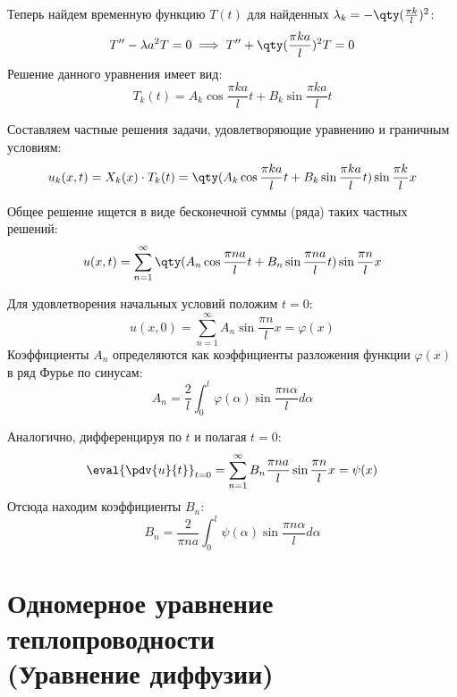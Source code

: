 Теперь найдем временную функцию $T(t)$ для найденных $\lambda_k = -\qty(\frac{\pi k}{l})^2$:
\begin{equation}
	T'' - \lambda a^2 T = 0 \implies T'' + \qty(\frac{\pi k a}{l})^2 T = 0
\end{equation}
Решение данного уравнения имеет вид:
\begin{equation}
	T_k(t) = A_k \cos \frac{\pi k a}{l} t + B_k \sin \frac{\pi k a}{l} t
\end{equation}

Составляем частные решения задачи, удовлетворяющие уравнению и граничным условиям:
\begin{equation}
	u_k(x,t) = X_k(x) \cdot T_k(t) = \qty( A_k \cos \frac{\pi k a}{l} t + B_k \sin \frac{\pi k a}{l} t ) \sin \frac{\pi k}{l} x
\end{equation}

Общее решение ищется в виде бесконечной суммы (ряда) таких частных решений:
\begin{equation}
	u(x,t) = \sum_{n=1}^{\infty} \qty( A_n \cos \frac{\pi n a}{l} t + B_n \sin \frac{\pi n a}{l} t ) \sin \frac{\pi n}{l} x
\end{equation}

Для удовлетворения начальных условий положим $t=0$:
\begin{equation}
	u(x,0) = \sum_{n=1}^{\infty} A_n \sin \frac{\pi n}{l} x = \varphi(x)
\end{equation}
Коэффициенты $A_n$ определяются как коэффициенты разложения функции $\varphi(x)$ в ряд Фурье по синусам:
\begin{equation}
	A_n = \frac{2}{l} \int_0^l \varphi(\alpha) \sin \frac{\pi n \alpha}{l} d\alpha
\end{equation}

Аналогично, дифференцируя по $t$ и полагая $t=0$:
\begin{equation}
	\eval{\pdv{u}{t}}_{t=0} = \sum_{n=1}^{\infty} B_n \frac{\pi n a}{l} \sin \frac{\pi n}{l} x = \psi(x)
\end{equation}
Отсюда находим коэффициенты $B_n$:
\begin{equation}
	B_n = \frac{2}{\pi n a} \int_0^l \psi(\alpha) \sin \frac{\pi n \alpha}{l} d\alpha
\end{equation}

\newpage
\section{Одномерное уравнение теплопроводности\texorpdfstring{\\}{ }(Уравнение диффузии)}

